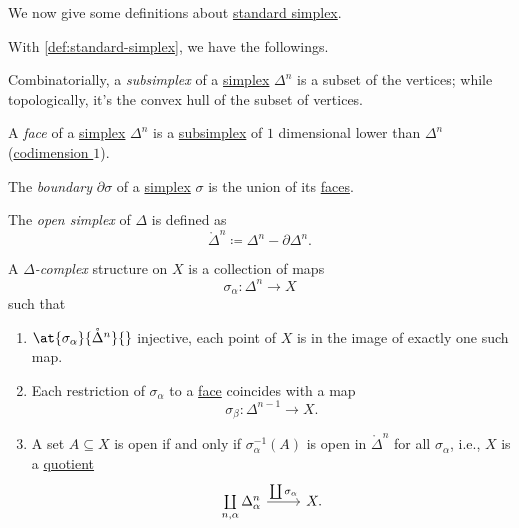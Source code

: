 We now give some definitions about \hyperref[def:standard-simplex]{standard simplex}.
\begin{definition*}
	With \autoref{def:standard-simplex}, we have the followings.
	\begin{definition}[Subsimplex]\label{def:subsimplex}
		Combinatorially, a \emph{subsimplex} of a \hyperref[def:standard-simplex]{simplex} \(\Delta^n\) is a
		subset of the vertices; while topologically, it's the convex hull of the subset of vertices.
		\begin{figure}[H]
			\centering
			\label{fig:def:subsimplex}
		\end{figure}
	\end{definition}

	\begin{definition}[Face]\label{def:face}
		A \emph{face} of a \hyperref[def:standard-simplex]{simplex} \(\Delta ^n\) is a \hyperref[def:subsimplex]{subsimplex} of \(1\) dimensional lower
		than \(\Delta ^n\) (\underline{codimension \(1\)}).
	\end{definition}

	\begin{definition}[Boundary]\label{def:boundary}
		The \emph{boundary} \(\partial \sigma \) of a \hyperref[def:standard-simplex]{simplex} \(\sigma \) is the union of its \hyperref[def:face]{faces}.
	\end{definition}

	\begin{definition}\label{def:open-simplex}
		The \emph{open simplex} of \(\Delta \) is defined as
		\[
			\mathring{\Delta}^n \coloneqq \Delta^n - \partial \Delta^n.
		\]
	\end{definition}
\end{definition*}

\begin{definition}\label{def:delta-complex}
	A \emph{\(\Delta \)-complex} structure on \(X\) is a collection of maps
	\[
		\sigma _\alpha \colon \Delta ^n\to X
	\]
	such that
	\begin{enumerate}[(1)]
		\item \(\at{\sigma _\alpha }{\mathring{\Delta}^n}{}\) injective, each point of \(X\) is in the image of exactly one such map.
		\item Each restriction of \(\sigma _\alpha \) to a \hyperref[def:face]{face} coincides with a map
		      \[
			      \sigma _\beta \colon \Delta^{n-1} \to X.
		      \]
		\item A set \(A\subseteq X\) is open if and only if \(\sigma ^{-1} _\alpha (A)\) is open in \(\mathring{\Delta }^n\) for all
		      \(\sigma _\alpha \), i.e., \(X\) is a \hyperref[CW-complex-quotient]{quotient}
		      \[
			      \begin{tikzcd}
				      {\coprod\limits_{n, \alpha }\Delta ^n_\alpha} & {X.}
				      \arrow["{\coprod \sigma _\alpha}", from=1-1, to=1-2]
			      \end{tikzcd}
		      \]
	\end{enumerate}
\end{definition}

